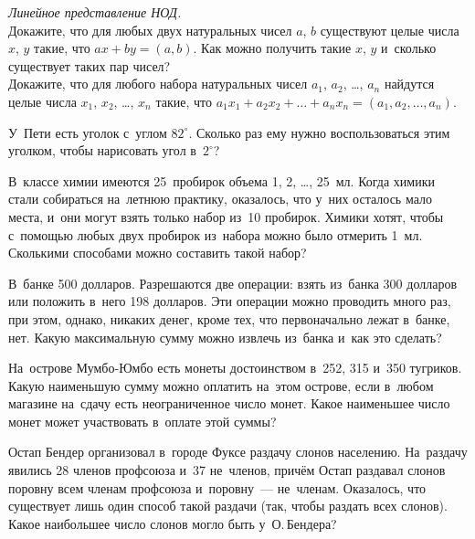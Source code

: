 


\begin{problems}

\item\emph{Линейное представление НОД.}
\\
\subproblem
Докажите, что для любых двух натуральных чисел $a$, $b$ существуют целые числа
$x$, $y$ такие, что $a x + b y = (a, b)$.
Как можно получить такие $x$, $y$ и~сколько существует таких пар чисел?
\\
\subproblem
Докажите, что для любого набора натуральных чисел
$a_{1}$, $a_{2}$, \ldots, $a_{n}$
найдутся целые числа $x_{1}$, $x_{2}$, \ldots, $x_{n}$ такие, что
\(
    a_{1} x_{1} + a_{2} x_{2} + \ldots + a_{n} x_{n}
=
    (a_{1}, a_{2}, \ldots, a_{n})
\).

\item
У~Пети есть уголок с~углом $82^{\circ}$.
Сколько раз ему нужно воспользоваться этим уголком, чтобы нарисовать угол
в~$2^{\circ}$?

\item
В~классе химии имеются 25~пробирок объема 1, 2, \ldots, 25~мл.
Когда химики стали собираться на~летнюю практику, оказалось, что у~них осталось
мало места, и~они могут взять только набор из~10 пробирок.
Химики хотят, чтобы с~помощью любых двух пробирок из~набора можно было отмерить
1~мл.
Сколькими способами можно составить такой набор?

\item
В~банке 500 долларов.
Разрешаются две операции: взять из~банка 300 долларов или положить в~него
198 долларов.
Эти операции можно проводить много раз, при этом, однако, никаких денег, кроме
тех, что первоначально лежат в~банке, нет.
Какую максимальную сумму можно извлечь из~банка и~как это сделать?

\item
На~острове Мумбо-Юмбо есть монеты достоинством в~252, 315 и~350 тугриков.
Какую наименьшую сумму можно оплатить на~этом острове, если в~любом магазине
на~сдачу есть неограниченное число монет.
Какое наименьшее число монет может участвовать в~оплате этой суммы?

\item
Остап Бендер организовал в~городе Фуксе раздачу слонов населению.
На~раздачу явились 28 членов профсоюза и~37 не~членов, причём Остап раздавал
слонов поровну всем членам профсоюза и~поровну~--- не~членам.
Оказалось, что существует лишь один способ такой раздачи (так, чтобы раздать
всех слонов).
Какое наибольшее число слонов могло быть у~О.\,Бендера?


\end{problems}
